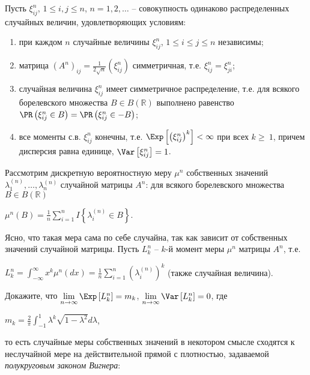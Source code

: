 \begin{problem}

Пусть $\xi _{ij}^{n} $, $1\le i,j\le n$, $n=1,2,\ldots $ -- совокупность одинаково распределенных случайных величин, удовлетворяющих условиям:

\begin{enumerate}
\item \label{zero}  при каждом $n$ случайные величины $\xi _{ij}^{n} $, $1\le i\le j\le n$ независимы;

\item \label{first}  матрица $\left(A^{n} \right)_{ij} =\frac{1}{2\sqrt{n} } \left(\xi _{ij}^{n} \right)$ симметричная, т.е. $\xi _{ij}^{n} =\xi _{ji}^{n} $;

\item \label{second} случайная величина $\xi _{ij}^{n} $ имеет симметричное распределение, т.е. для всякого борелевского множества $B\in B({\mathbb R})$ выполнено равенство $\PR\left(\xi _{ij}^{n} \in B\right)=\PR\left(\xi _{ij}^{n} \in -B\right)$;

\item \label{third} все моменты с.в. $\xi _{ij}^{n} $ конечны, т.е. $\Exp\left[\left(\xi _{ij}^{n} \right)^{k} \right]<\infty $ при всех $k\ge~1$, причем дисперсия равна единице, $\Var\left[\xi _{ij}^{n} \right]=1$.
\end{enumerate}

Рассмотрим дискретную вероятностную меру $\mu ^{n} $ собственных значений $\lambda _{1}^{(n)} ,\ldots ,\lambda _{n}^{(n)} $ случайной матрицы $A^{n} $: для всякого борелевского множества $B\in B({\mathbb R})$
\begin{center}
$\mu ^{n} (B)=\frac{1}{n} \sum _{i=1}^{n}I\left\{\lambda _{i}^{(n)} \in B\right\} $. 
\end{center}
Ясно, что такая мера сама по себе случайна, так как зависит от собственных значений случайной матрицы. Пусть $L_{k}^{n} $ -- $k$-й момент меры $\mu ^{n} $ матрицы $A^{n} $, т.е. 
\begin{center}
$L_{k}^{n} =\int _{-\infty }^{\infty }x^{k} \mu ^{n} (dx) =\frac{1}{n} \sum _{i=1}^{n}\left(\lambda _{i}^{(n)} \right)^{k}  $ (также случайная величина).
\end{center}
Докажите, что $\mathop{\lim }\limits_{n\to \infty } \Exp\left[L_{k}^{n} \right]=m_{k} $, $\mathop{\lim }\limits_{n\to \infty } \Var\left[L_{k}^{n} \right]=0$, где
\begin{center}
 $m_{k} =\frac{2}{\pi } \int _{-1}^{1}\lambda ^{k} \sqrt{1-\lambda ^{2} } d\lambda  $,
\end{center}
то есть случайные меры собственных значений в некотором смысле сходятся к неслучайной мере на действительной прямой с плотностью, задаваемой \textit{полукруговым законом Вигнера}: 


\end{problem}
